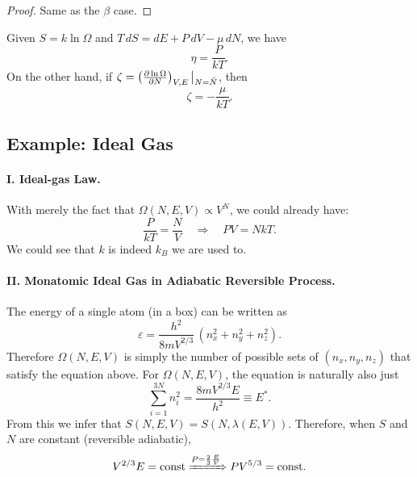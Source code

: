\begin{proof}
Same as the $\beta$ case.
\end{proof}

\begin{proposition}
Given $S=k\ln\Omega$ and $T\,dS = dE + P\,dV - \mu\,dN$, we have
\[
    \eta = \frac{P}{kT}.
\]
On the other hand, if $\zeta = \left(\frac{\partial\ln\Omega}{\partial N}\right)_{V,E}\big|_{N=\bar{N}}$, then
\[
    \zeta = -\frac{\mu}{kT}.
\]
\end{proposition}

\subsection{Example: Ideal Gas}

\paragraph{I. Ideal-gas Law.}
With merely the fact that $\Omega(N,E,V)\propto V^{N}$, we could already have:
\[
    \frac{P}{kT} = \frac{N}{V} \quad\Longrightarrow\quad PV = NkT.
\]
We could see that $k$ is indeed $k_B$ we are used to.

\paragraph{II. Monatomic Ideal Gas in Adiabatic Reversible Process.}
The energy of a single atom (in a box) can be written as
\[
    \varepsilon = \frac{h^{2}}{8mV^{2/3}}\,(n_x^{2}+n_y^{2}+n_z^{2}).
\]
Therefore $\Omega(N,E,V)$ is simply the number of possible sets of $(n_x,n_y,n_z)$ that satisfy the equation above. For $\Omega(N,E,V)$, the equation is naturally also just
\[
    \sum_{i=1}^{3N} n_i^{2} = \frac{8m V^{2/3} E}{h^{2}} \equiv E^{*}.
\]
From this we infer that $S(N,E,V) = S(N,\lambda(E,V))$.
Therefore, when $S$ and $N$ are constant (reversible adiabatic),
\[
    V^{2/3}E = \mathrm{const} \xRightarrow{P=\frac{2}{3}\frac{E}{V}} P V^{5/3} = \mathrm{const}.
\]

